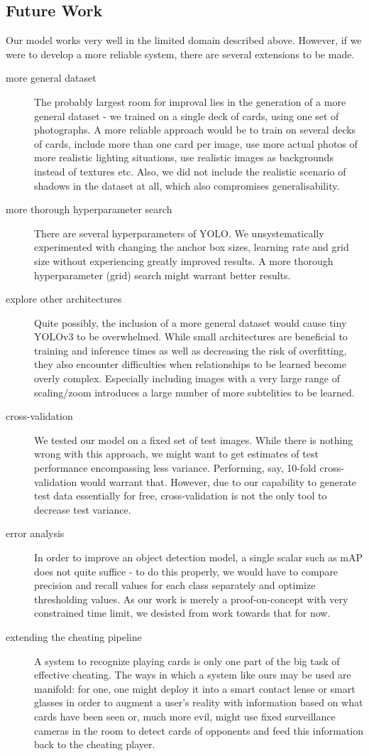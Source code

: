 \documentclass[a4paper]{article}
\begin{document}
\subsection*{Future Work}
Our model works very well in the limited domain described above. However, if we were to develop a more reliable system, there are several extensions to be made.
\begin{description}
\item[more general dataset] The probably largest room for improval lies in the generation of a more general dataset - we trained on a single deck of cards, using one set of photographs. A more reliable approach would be to train on several decks of cards, include more than one card per image, use more actual photos of more realistic lighting situations, use realistic images as backgrounds instead of textures etc.
Also, we did not include the realistic scenario of shadows in the dataset at all, which also compromises generalisability.
\item[more thorough hyperparameter search] There are several hyperparameters of YOLO. We unsystematically experimented with changing the anchor box sizes, learning rate and grid size without experiencing greatly improved results. A more thorough hyperparameter (grid) search might warrant better results.

\item[explore other architectures] Quite possibly, the inclusion of a more general dataset would cause tiny YOLOv3 to be overwhelmed. While small architectures are beneficial to training and inference times as well as decreasing the risk of overfitting, they also encounter difficulties when relationships to be learned become overly complex. Especially including images with a very large range of scaling/zoom introduces a large number of more subtelities to be learned.
\item[cross-validation] We tested our model on a fixed set of test images. While there is nothing wrong with this approach, we might want to get estimates of test performance encompassing less variance. Performing, say, 10-fold cross-validation would warrant that. However, due to our capability to generate test data essentially for free, cross-validation is not the only tool to decrease test variance.
\item[error analysis] In order to improve an object detection model, a single scalar such as mAP does not quite suffice - to do this properly, we would have to compare precision and recall values for each class separately and optimize thresholding values. As our work is merely a proof-on-concept with very constrained time limit, we desisted from work towards that for now.
\item[extending the cheating pipeline] A system to recognize playing cards is only one part of the big task of effective cheating. The ways in which a system like ours may be used are manifold: for one, one might deploy it into a smart contact lense or smart glasses in order to augment a user's reality with information based on what cards have been seen or, much more evil, might use fixed surveillance cameras in the room to detect cards of opponents and feed this information back to the cheating player.
\end{description}
\end{document}
